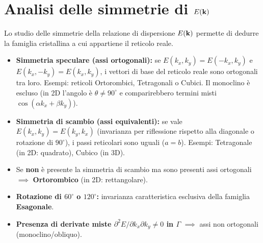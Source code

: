 \section{Analisi delle simmetrie di $E(\mathbf{k})$}
Lo studio delle simmetrie della relazione di dispersione $E(\mathbf{k})$ permette di dedurre la famiglia cristallina a cui appartiene il reticolo reale.
\begin{itemize}
    \item \textbf{Simmetria speculare (assi ortogonali):} se $E(k_x,k_y)=E(-k_x,k_y)$ e $E(k_x,-k_y)=E(k_x,k_y)$, i vettori di base del reticolo reale sono ortogonali tra loro. Esempi: reticoli Ortorombici, Tetragonali o Cubici. Il monoclino è escluso (in 2D l'angolo è $\theta\neq90^\circ$ e comparirebbero termini misti $\cos(\alpha k_x+\beta k_y)$).
    \item \textbf{Simmetria di scambio (assi equivalenti):} se vale $E(k_x,k_y)=E(k_y,k_x)$ (invarianza per riflessione rispetto alla diagonale o rotazione di $90^\circ$), i passi reticolari sono uguali ($a=b$). Esempi: Tetragonale (in 2D: quadrato), Cubico (in 3D).
    \item Se \textbf{non} è presente la simmetria di scambio ma sono presenti assi ortogonali $\implies$ \textbf{Ortorombico} (in 2D: rettangolare).
    \item \textbf{Rotazione di $60^\circ$ o $120^\circ$:} invarianza caratteristica esclusiva della famiglia \textbf{Esagonale}.
    \item \textbf{Presenza di derivate miste $\partial^2E/\partial k_x\partial k_y \neq 0$ in $\Gamma$} $\implies$ assi non ortogonali (monoclino/obliquo).
\end{itemize}


